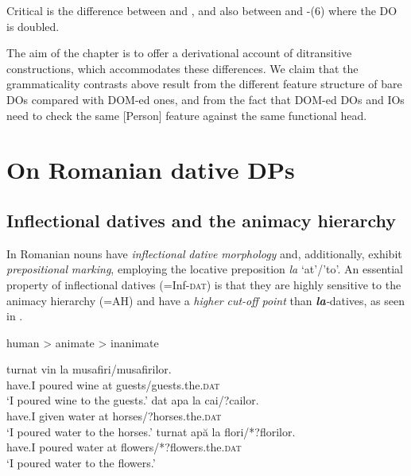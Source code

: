 \documentclass[output=paper,modfonts,nonflat,newtxmath]{langsci/langscibook}
\begin{document}
          


Critical is the difference between  and , and also between  and -(6) where the DO is doubled.

The aim of the chapter is to offer a derivational account of ditransitive constructions, which accommodates these differences. We claim that the grammaticality contrasts above result from the different feature structure of bare DOs compared with DOM-ed ones, and from the fact that DOM-ed DOs and IOs need to check the same [Person] feature against the same functional head.

\section{On Romanian dative DPs} %

\subsection{Inflectional datives and the animacy hierarchy} %

In Romanian nouns have \textit{inflectional} \textit{dative} \textit{morphology} and, additionally, exhibit \textit{prepositional} \textit{marking}, employing the locative preposition \textit{la} ‘at’/’to’. An essential property of inflectional datives (=Inf-\textsc{dat}) is that they are highly sensitive to the animacy hierarchy (=AH) and have a \textit{higher} \textit{cut-off} \textit{point} than \textbf{\textit{la}}\textit{{}-}datives, as seen in . 

\ea%
    \label{ex:cornilescu:7}
    human > animate > inanimate
    \z

         

\ea%
    \label{ex:cornilescu:8}
    \ea \label{ex:cornilescu:8a}
       {turnat}  {vin}   {la} musafiri/musafirilor.	\\
       	 have.I   poured   wine   at guests/guests.the.\textsc{dat}	 \\
    \glt ‘I poured wine to the guests.’
    \ex \label{ex:cornilescu:8b}
    	 {dat}    {apa}  {la} cai/{?}cailor. 	\\
    	have.I given   water   at horses/{?}horses.the.\textsc{dat} \\
    	\glt ‘I poured water to the horses.’
    \ex  \label{ex:cornilescu:8c}
     {turnat}  {apă}  {la} flori/*?florilor.	\\
     		have.I poured   water   at flowers/*?flowers.the.\textsc{dat} \\
    \glt	‘I poured water to the flowers.’
   	\z 
    \z
\end{document}

